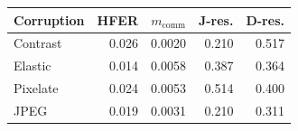 \begin{tabular}{lrrrr}
\toprule
Corruption & HFER & $m_{\mathrm{comm}}$ & J-res. & D-res. \\
\midrule
Contrast & 0.026 & 0.0020 & 0.210 & 0.517 \\
Elastic & 0.014 & 0.0058 & 0.387 & 0.364 \\
Pixelate & 0.024 & 0.0053 & 0.514 & 0.400 \\
JPEG & 0.019 & 0.0031 & 0.210 & 0.311 \\
\bottomrule
\end{tabular}
